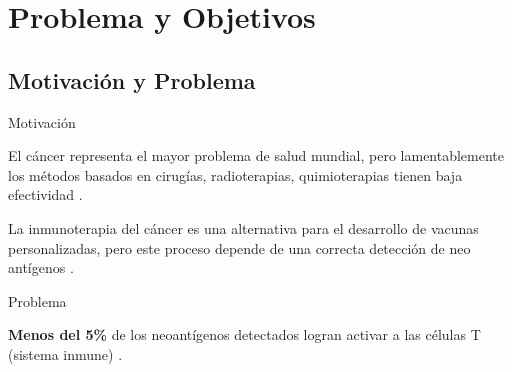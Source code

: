 \documentclass[10pt]{beamer}
\newcommand{\1}{
	\setbeamertemplate{background}{
		\texttt{[image: ../img/1]}
		\tikz[overlay] \fill[fill opacity=0.75,fill=white] (0,0) rectangle (-\paperwidth,\paperheight);
	}
}
\begin{document}
	\section{Problema y Objetivos}
	
	\subsection{Motivación y Problema}
	
	\begin{frame}{Motivación}{}	
		
		\begin{block}{}
			El cáncer representa el mayor problema de salud mundial, pero lamentablemente los métodos basados en cirugías, radioterapias, quimioterapias tienen baja efectividad \cite{peng2019neoantigen}.
		\end{block}	
		
		\begin{block}{}
			La inmunoterapia del cáncer es una alternativa para el desarrollo de vacunas personalizadas, pero este proceso depende de una correcta detección de neo antígenos \cite{de2020neoantigen, peng2019neoantigen}.
		\end{block}
		
	\end{frame}
	
	
	
	\begin{frame}{Problema}{}
		
		\begin{block}{}
			\textbf{Menos del 5\%} de los neoantígenos detectados logran activar a las células T (sistema inmune) \cite{de2020neoantigen, mill2022neoms, bulik2019deep, bassani2015mass, yadav2014predicting}. 
		\end{block}
		
	\end{frame}
	
\end{document}
